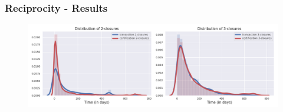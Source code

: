 \documentclass{beamer}
\begin{document}
\begin{frame}
\begin{center}
\begin{figure}
		\end{figure}
	\end{center}
\end{frame}


\begin{frame}
	\frametitle{Reciprocity - \textbf{Results}}
	\begin{figure}
		\includegraphics[width=\linewidth]{./figures/2-and-3-closures}
	\end{figure}
\end{frame}
\end{document}
